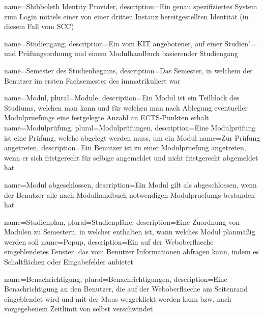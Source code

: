 {
	name=Shibboleth Identity Provider,
	description={Ein genau spezifiziertes System zum Login mittels einer von einer dritten Instanz bereitgestellten Identität (in diesem Fall vom \gls{SCC})}
}

{
	name=Studiengang,
	description={Ein vom KIT angebotener, auf einer Studien"= und Prüfungsordnung und einem Modulhandbuch basierender Studiengang}
}

{
	name=Semester des Studienbeginns,
	description={Das Semester, in welchem der \gls{Benutzer} im ersten Fachsemester des  immatrikuliert war}
}

{
	name=Modul,
	plural=Module,
	description={Ein Modul ist ein Teilblock des Studiums, welchen man  kann und für welchen man nach Ablegung eventueller \glspl{Modulpruefung} eine festgelegte Anzahl an ECTS-Punkten erhält}
}
{
	name=Modulprüfung,
	plural=Modulprüfungen,
	description={Eine Modulprüfung ist eine Prüfung, welche abgelegt werden muss, um ein Modul }
}
{
	name=Zur Prüfung angetreten,
	description={Ein \gls{Benutzer} ist zu einer \gls{Modulpruefung} angetreten, wenn er sich fristgerecht für selbige angemeldet und nicht fristgerecht abgemeldet hat}
}

{
	name=Modul abgeschlossen,
	description={Ein \gls{Modul} gilt als abgeschlossen, wenn der \gls{Benutzer} alle nach Modulhandbuch notwendigen \glspl{Modulpruefung} bestanden hat}
}

{
	name=Studienplan,
	plural=Studienpläne,
	description={Eine Zuordnung von Modulen zu Semestern, in welcher enthalten ist, wann welches Modul planmäßig  werden soll}
}
{
	name=Popup,
	description={Ein auf der \gls{Weboberflaeche} eingeblendetes Fenster, das vom \gls{Benutzer} Informationen abfragen kann, indem es Schaltflächen oder Eingabefelder anbietet}
}

{
	name=Benachrichtigung,
	plural=Benachrichtigungen,
	description={Eine Benachrichtigung an den \gls{Benutzer}, die auf der \gls{Weboberflaeche} am Seitenrand eingeblendet wird und mit der Maus weggeklickt werden kann bzw. nach vorgegebenem Zeitlimit von selbst verschwindet}
}

